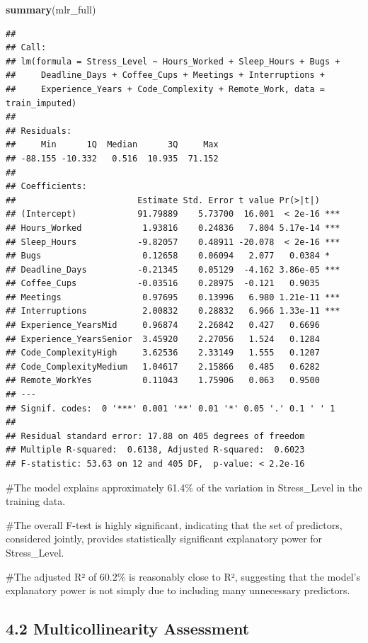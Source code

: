 \documentclass[
]{article}
\newenvironment{Shaded}{\begin{snugshade}}{\end{snugshade}}
\newcommand{\FunctionTok}[1]{\textcolor[rgb]{0.13,0.29,0.53}{\textbf{#1}}}
\newcommand{\NormalTok}[1]{#1}
\begin{document}
\begin{Shaded}
\begin{Highlighting}[]
\FunctionTok{summary}\NormalTok{(mlr\_full)}
\end{Highlighting}
\end{Shaded}

\begin{verbatim}
## 
## Call:
## lm(formula = Stress_Level ~ Hours_Worked + Sleep_Hours + Bugs + 
##     Deadline_Days + Coffee_Cups + Meetings + Interruptions + 
##     Experience_Years + Code_Complexity + Remote_Work, data = train_imputed)
## 
## Residuals:
##     Min      1Q  Median      3Q     Max 
## -88.155 -10.332   0.516  10.935  71.152 
## 
## Coefficients:
##                        Estimate Std. Error t value Pr(>|t|)    
## (Intercept)            91.79889    5.73700  16.001  < 2e-16 ***
## Hours_Worked            1.93816    0.24836   7.804 5.17e-14 ***
## Sleep_Hours            -9.82057    0.48911 -20.078  < 2e-16 ***
## Bugs                    0.12658    0.06094   2.077   0.0384 *  
## Deadline_Days          -0.21345    0.05129  -4.162 3.86e-05 ***
## Coffee_Cups            -0.03516    0.28975  -0.121   0.9035    
## Meetings                0.97695    0.13996   6.980 1.21e-11 ***
## Interruptions           2.00832    0.28832   6.966 1.33e-11 ***
## Experience_YearsMid     0.96874    2.26842   0.427   0.6696    
## Experience_YearsSenior  3.45920    2.27056   1.524   0.1284    
## Code_ComplexityHigh     3.62536    2.33149   1.555   0.1207    
## Code_ComplexityMedium   1.04617    2.15866   0.485   0.6282    
## Remote_WorkYes          0.11043    1.75906   0.063   0.9500    
## ---
## Signif. codes:  0 '***' 0.001 '**' 0.01 '*' 0.05 '.' 0.1 ' ' 1
## 
## Residual standard error: 17.88 on 405 degrees of freedom
## Multiple R-squared:  0.6138, Adjusted R-squared:  0.6023 
## F-statistic: 53.63 on 12 and 405 DF,  p-value: < 2.2e-16
\end{verbatim}

\#The model explains approximately 61.4\% of the variation in
Stress\_Level in the training data.

\#The overall F-test is highly significant, indicating that the set of
predictors, considered jointly, provides statistically significant
explanatory power for Stress\_Level.

\#The adjusted R² of 60.2\% is reasonably close to R², suggesting that
the model's explanatory power is not simply due to including many
unnecessary predictors.

\subsection{4.2 Multicollinearity
Assessment}\label{multicollinearity-assessment}
\end{document}
